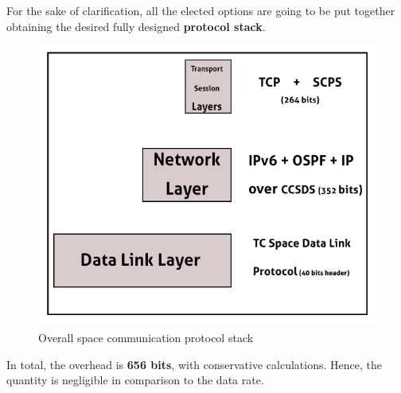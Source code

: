 For the sake of clarification, all the elected options are going to be put together obtaining the desired fully designed \textbf{protocol stack}.

\begin{figure}[H]
\centering
\includegraphics[scale=0.8]{./sections/CommunicationsDept/results2}
\caption{Overall space communication protocol stack }
\label{fig:osi}
\end{figure}

In total, the overhead is \textbf{656 bits}, with conservative calculations. Hence, the quantity is negligible in comparison to the data rate. 